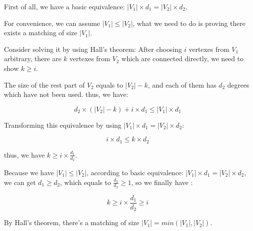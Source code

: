 First of all, we have a basic equivalence: $|V_1| \times d_1 = |V_2| \times d_2$. \par
For convenience, we can assume $|V_1| \leq |V_2|$, what we need to do is proving there exists a matching of size $|V_1|$.\par

Consider solving it by using Hall's theorem: After choosing $i$ vertexes from $V_1$ arbitrary, there are $k$ vertexes from $V_2$ which are connected directly, we need to show $k \geq i$.\par

The size of the rest part of $V_2$ equals to $|V_2| - k$, and each of them has $d_2$ degrees which have not been used.
thus, we have:

\[d_2 \times (|V_2|-k) + i \times d_1 \leq |V_1| \times d_1\]

Transforming this equivalence by using $|V_1| \times d_1 = |V_2| \times d_2$:

\[i \times d_1 \leq k \times d_2\]

thus, we have $k \geq i \times \frac{d_1}{d_2}$.

Because we have $|V_1| \leq |V_2|$, according to basic equivalence: $|V_1| \times d_1 = |V_2| \times d_2$, we can get $d_1 \geq d_2$, which equals to $\frac{d_1}{d_2} \geq 1$, so we finally have :

\[k \geq i \times \frac{d_1}{d_2} \geq i\]

By Hall's theorem, there's a matching of size $|V_1| = min(|V_1|, |V_2|)$.
